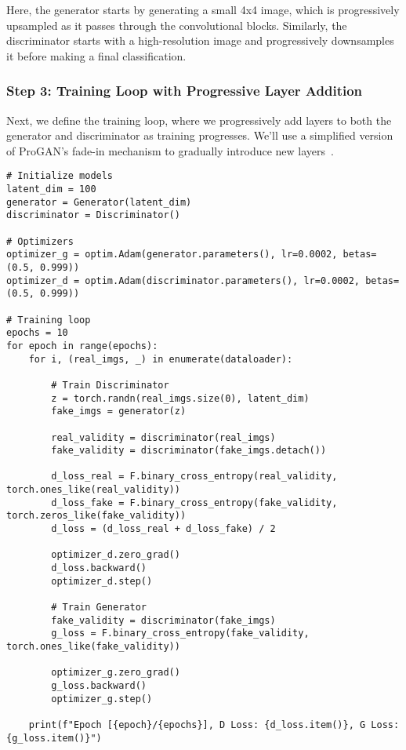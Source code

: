 Here, the generator starts by generating a small 4x4 image, which is progressively upsampled as it passes through the convolutional blocks. Similarly, the discriminator starts with a high-resolution image and progressively downsamples it before making a final classification.

\subsubsection{Step 3: Training Loop with Progressive Layer Addition}
Next, we define the training loop, where we progressively add layers to both the generator and discriminator as training progresses. We'll use a simplified version of ProGAN's fade-in mechanism to gradually introduce new layers~\cite{karras2017progressive}.

\begin{lstlisting}[style=python]
# Initialize models
latent_dim = 100
generator = Generator(latent_dim)
discriminator = Discriminator()

# Optimizers
optimizer_g = optim.Adam(generator.parameters(), lr=0.0002, betas=(0.5, 0.999))
optimizer_d = optim.Adam(discriminator.parameters(), lr=0.0002, betas=(0.5, 0.999))

# Training loop
epochs = 10
for epoch in range(epochs):
    for i, (real_imgs, _) in enumerate(dataloader):
        
        # Train Discriminator
        z = torch.randn(real_imgs.size(0), latent_dim)
        fake_imgs = generator(z)
        
        real_validity = discriminator(real_imgs)
        fake_validity = discriminator(fake_imgs.detach())
        
        d_loss_real = F.binary_cross_entropy(real_validity, torch.ones_like(real_validity))
        d_loss_fake = F.binary_cross_entropy(fake_validity, torch.zeros_like(fake_validity))
        d_loss = (d_loss_real + d_loss_fake) / 2

        optimizer_d.zero_grad()
        d_loss.backward()
        optimizer_d.step()

        # Train Generator
        fake_validity = discriminator(fake_imgs)
        g_loss = F.binary_cross_entropy(fake_validity, torch.ones_like(fake_validity))

        optimizer_g.zero_grad()
        g_loss.backward()
        optimizer_g.step()

    print(f"Epoch [{epoch}/{epochs}], D Loss: {d_loss.item()}, G Loss: {g_loss.item()}")
\end{lstlisting}

